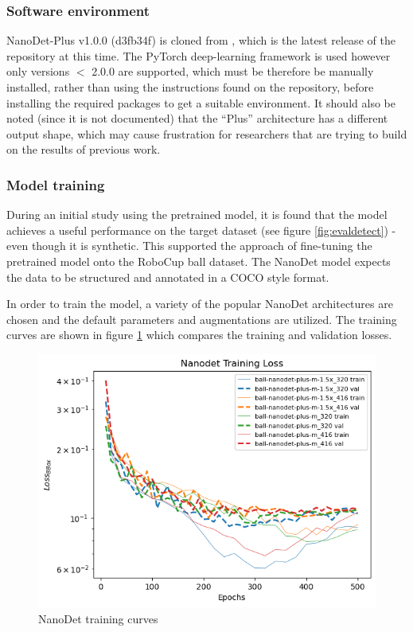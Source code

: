 \documentclass[a4paper,twoside,12pt]{report}
\begin{document}
\subsubsection{Software environment}

NanoDet-Plus v1.0.0 (d3fb34f) is cloned from \cite{nanodet}, which is the latest release of the repository at this time. The PyTorch deep-learning framework is used however only versions $<$ 2.0.0 are supported, which must be therefore be manually installed, rather than using the instructions found on the repository, before installing the required packages to get a suitable environment. It should also be noted (since it is not documented) that the ``Plus'' architecture has a different output shape, which may cause frustration for researchers that are trying to build on the results of previous work.

\subsubsection{Model training}

During an initial study using the pretrained model, it is found that the model achieves a useful performance on the target dataset (see figure \ref{fig:evaldetect}) - even though it is synthetic. This supported the approach of fine-tuning the pretrained model onto the RoboCup ball dataset. The NanoDet model expects the data to be structured and annotated in a COCO style format. 

In order to train the model, a variety of the popular NanoDet architectures are chosen and the default parameters and augmentations are utilized. The training curves are shown in figure \ref{fig:nanodet_train} which compares the training and validation losses.

\begin{figure}[h!]
\begin{center}
\includegraphics[width=13cm]{images/nanodet_train.png}
\caption{NanoDet training curves}
\label{fig:nanodet_train}
\end{center}
\end{figure}
\end{document}
